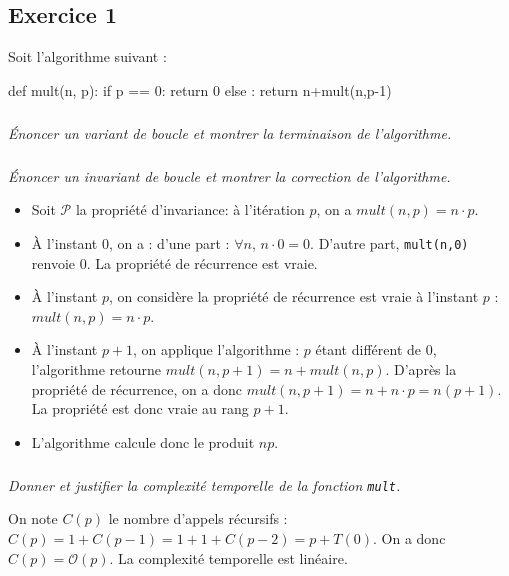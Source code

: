 \documentclass[10pt,fleqn]{book} %
\begin{document}

\vspace{7cm}
\pagestyle{fancy}
\thispagestyle{plain}

\setcounter{secnumdepth}{5}
\def\columnseprulecolor{\color{ocre}}
\setlength{\columnseprule}{0.4pt} 

\ifprof
\else
\begin{multicols}{2}
\fi


\section*{Exercice 1}
\setcounter{subparagraph}{0}

Soit l'algorithme suivant : 

\begin{py}
\begin{python}
def mult(n, p):
    if p == 0:
        return 0
    else :
        return n+mult(n,p-1)
\end{python}
\end{py}

\subparagraph{}
\textit{Énoncer un variant de boucle et montrer la terminaison de l'algorithme.}

\subparagraph{}
\textit{Énoncer un invariant de boucle et montrer la correction de l'algorithme.}
\ifprof
\begin{corrige}
\begin{itemize}
\item Soit $\mathcal{P}$ la propriété d'invariance: à l'itération $p$, on a $mult(n,p)=n\cdot p$. 
\item À l'instant 0, on a : d'une part : $\forall n$, $n\cdot 0 = 0$. D'autre part, \texttt{mult(n,0)} renvoie 0. La propriété de récurrence est vraie. 
\item À l'instant $p$, on considère la propriété de récurrence est vraie à l'instant $p$ : $mult(n,p)=n\cdot p$.
\item À l'instant $p+1$, on applique l'algorithme : $p$ étant différent de 0, l'algorithme retourne $mult(n,p+1)=n+mult(n,p)$. D'après la propriété de récurrence, on a donc $mult(n,p+1)=n+ n\cdot p =n(p+1) $. La propriété est donc vraie au rang $p+1$.
\item L'algorithme calcule donc le produit $np$.
\end{itemize}
\end{corrige}
\else
\fi

\subparagraph{}
\textit{Donner et justifier la complexité temporelle de la fonction \texttt{mult}.}
\ifprof
\begin{corrige}
On note $C(p)$ le nombre d'appels récursifs : $C(p) = 1+C(p-1) = 1+1+C(p-2)=p+T(0)$. On a donc $C(p)=\mathcal{O}(p)$. La complexité temporelle est linéaire.
\end{corrige}
\else
\fi


\end{multicols}
\end{document}
